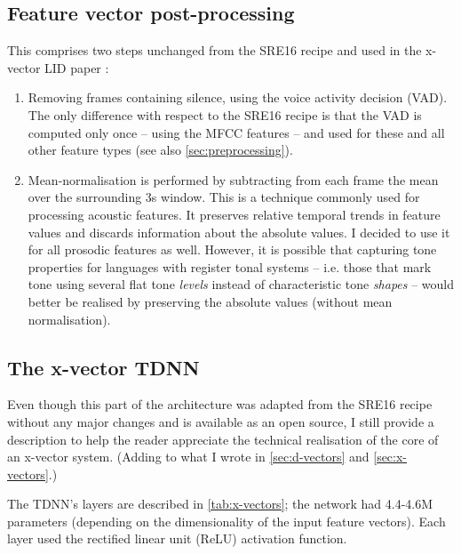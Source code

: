 \documentclass[bsc,frontabs,twoside,singlespacing,parskip,deptreport]{infthesis}
\begin{document}
{{    \subsection{Feature vector post-processing}{
      \label{sec:feature-postprocessing}
      This comprises two steps unchanged from the SRE16 recipe and used in the x-vector LID paper \citep{Snyder_et_al_2018}:
      \begin{enumerate}
        \item {Removing frames containing silence, using the voice activity decision (VAD). The only difference with respect to the SRE16 recipe is that the VAD is computed only once -- using the MFCC features -- and used for these and all other feature types (see also \autoref{sec:preprocessing}).}
        \item {Mean-normalisation is performed by subtracting from each frame the mean over the surrounding 3s window. This is a technique commonly used for processing acoustic features. It preserves relative temporal trends in feature values and discards information about the absolute values. I decided to use it for all prosodic features as well. However, it is possible that capturing tone properties for languages with register tonal systems -- i.e. those that mark tone using several flat tone \textit{levels} instead of characteristic tone \textit{shapes} -- would better be realised by preserving the absolute values (without mean normalisation).}
      \end{enumerate}
    }

    \subsection{The x-vector TDNN}{
      \label{sec:x-vector-tdnn}
      Even though this part of the architecture was adapted from the SRE16 recipe without any major changes and is available as an open source, I still provide a description to help the reader appreciate the technical realisation of the core of an x-vector system. (Adding to what I wrote in \autoref{sec:d-vectors} and \autoref{sec:x-vectors}.)

      The TDNN's layers are described in \autoref{tab:x-vectors}; the network had 4.4-4.6M parameters (depending on the dimensionality of the input feature vectors). Each layer used the rectified linear unit (ReLU) activation function.

}}}
\end{document}
